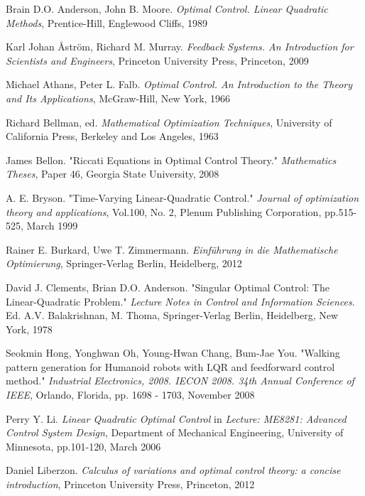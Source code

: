 \begin{thebibliography}{ABCD}

Brain D.O. Anderson, John B. Moore. \emph{Optimal Control. Linear Quadratic Methods}, Prentice-Hill, Englewood Cliffs, 1989

Karl Johan Åström, Richard M. Murray. \emph{Feedback Systems. An Introduction for Scientists and Engineers}, Princeton University Press, Princeton, 2009

Michael Athans, Peter L. Falb. \emph{Optimal Control. An Introduction to the Theory and Its Applications}, McGraw-Hill, New York, 1966

Richard Bellman, ed. \emph{Mathematical Optimization Techniques}, University of California Press, Berkeley and Los Angeles, 1963

James Bellon. "Riccati Equations in Optimal Control Theory." \emph{Mathematics Theses}, Paper 46, Georgia State University, 2008

A. E. Bryson. "Time-Varying Linear-Quadratic Control."  \emph{Journal of optimization theory and applications}, Vol.100, No. 2, Plenum Publishing Corporation, pp.515-525, March 1999

Rainer E. Burkard, Uwe T. Zimmermann. \emph{Einführung in die Mathematische Optimierung}, Springer-Verlag Berlin, Heidelberg, 2012

David J. Clements, Brian D.O. Anderson. "Singular Optimal Control: The Linear-Quadratic Problem."  \emph{Lecture Notes in Control and Information Sciences}. Ed. A.V. Balakrishnan, M. Thoma, Springer-Verlag Berlin, Heidelberg, New York, 1978

Seokmin Hong, Yonghwan Oh, Young-Hwan Chang, Bum-Jae You. "Walking pattern generation for Humanoid robots with LQR and feedforward control method." \emph{Industrial Electronics, 2008. IECON 2008. 34th Annual Conference of IEEE}, Orlando, Florida, pp. 1698 - 1703, November 2008

Perry Y. Li. \emph{Linear Quadratic Optimal Control} in \emph{Lecture: ME8281: Advanced Control System Design}, Department of Mechanical Engineering, University of Minnesota, pp.101-120, March 2006

Daniel Liberzon. \emph{Calculus of variations and optimal control theory: a concise introduction}, Princeton University Press, Princeton, 2012


\end{thebibliography}
